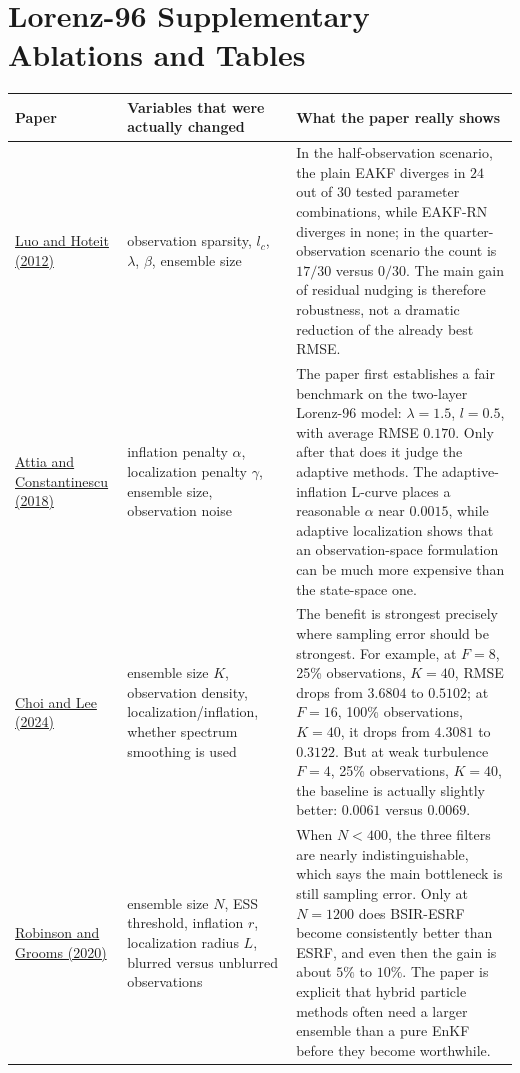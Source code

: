 \documentclass[12pt,a4paper]{article}
\begin{document}
\section{Lorenz-96 Supplementary Ablations and Tables}\label{app:lorenz-results}

\begin{longtable}{>{\raggedright\arraybackslash}p{3.2cm} >{\raggedright\arraybackslash}p{3.8cm} >{\raggedright\arraybackslash}p{6.4cm}}
\toprule
Paper & Variables that were actually changed & What the paper really shows \\
\midrule
\endhead
\href{https://arxiv.org/abs/1210.1318}{Luo and Hoteit (2012)} & observation sparsity, \(l_c\), \(\lambda\), \(\beta\), ensemble size & In the half-observation scenario, the plain EAKF diverges in \(24\) out of \(30\) tested parameter combinations, while EAKF-RN diverges in none; in the quarter-observation scenario the count is \(17/30\) versus \(0/30\). The main gain of residual nudging is therefore robustness, not a dramatic reduction of the already best RMSE. \\
\href{https://arxiv.org/abs/1806.10655}{Attia and Constantinescu (2018)} & inflation penalty \(\alpha\), localization penalty \(\gamma\), ensemble size, observation noise & The paper first establishes a fair benchmark on the two-layer Lorenz-96 model: \(\lambda=1.5\), \(l=0.5\), with average RMSE \(\mathbf{0.170}\). Only after that does it judge the adaptive methods. The adaptive-inflation L-curve places a reasonable \(\alpha\) near \(0.0015\), while adaptive localization shows that an observation-space formulation can be much more expensive than the state-space one. \\
\href{https://arxiv.org/abs/2404.00154}{Choi and Lee (2024)} & ensemble size \(K\), observation density, localization/inflation, whether spectrum smoothing is used & The benefit is strongest precisely where sampling error should be strongest. For example, at \(F=8\), 25\% observations, \(K=40\), RMSE drops from \(3.6804\) to \(\mathbf{0.5102}\); at \(F=16\), 100\% observations, \(K=40\), it drops from \(4.3081\) to \(\mathbf{0.3122}\). But at weak turbulence \(F=4\), 25\% observations, \(K=40\), the baseline is actually slightly better: \(\mathbf{0.0061}\) versus \(0.0069\). \\
\href{https://arxiv.org/abs/2006.04699}{Robinson and Grooms (2020)} & ensemble size \(N\), ESS threshold, inflation \(r\), localization radius \(L\), blurred versus unblurred observations & When \(N<400\), the three filters are nearly indistinguishable, which says the main bottleneck is still sampling error. Only at \(N=1200\) does BSIR-ESRF become consistently better than ESRF, and even then the gain is about \(5\%\) to \(10\%\). The paper is explicit that hybrid particle methods often need a larger ensemble than a pure EnKF before they become worthwhile. \\

\end{longtable}
\end{document}
